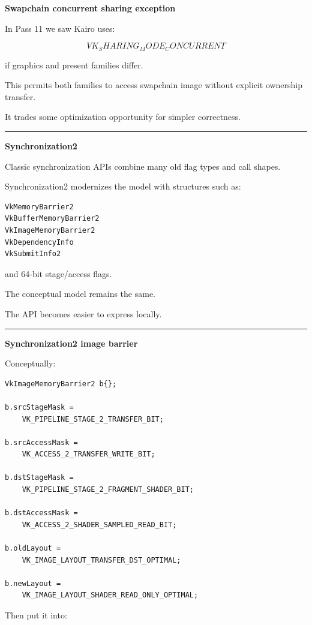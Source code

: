 \textbf{Swapchain concurrent sharing exception}

In Pass 11 we saw Kairo uses:

\[
VK_SHARING_MODE_CONCURRENT
\]

if graphics and present families differ.

This permits both families to access swapchain image without explicit ownership transfer.

It trades some optimization opportunity for simpler correctness.

\begin{center}\rule{0.5\linewidth}{0.5pt}\end{center}

\textbf{Synchronization2}

Classic synchronization APIs combine many old flag types and call shapes.

Synchronization2 modernizes the model with structures such as:

\begin{verbatim}
VkMemoryBarrier2
VkBufferMemoryBarrier2
VkImageMemoryBarrier2
VkDependencyInfo
VkSubmitInfo2
\end{verbatim}

and 64-bit stage/access flags.

The conceptual model remains the same.

The API becomes easier to express locally.

\begin{center}\rule{0.5\linewidth}{0.5pt}\end{center}

\textbf{Synchronization2 image barrier}

Conceptually:

\begin{verbatim}
VkImageMemoryBarrier2 b{};

b.srcStageMask =
    VK_PIPELINE_STAGE_2_TRANSFER_BIT;

b.srcAccessMask =
    VK_ACCESS_2_TRANSFER_WRITE_BIT;

b.dstStageMask =
    VK_PIPELINE_STAGE_2_FRAGMENT_SHADER_BIT;

b.dstAccessMask =
    VK_ACCESS_2_SHADER_SAMPLED_READ_BIT;

b.oldLayout =
    VK_IMAGE_LAYOUT_TRANSFER_DST_OPTIMAL;

b.newLayout =
    VK_IMAGE_LAYOUT_SHADER_READ_ONLY_OPTIMAL;
\end{verbatim}

Then put it into:

